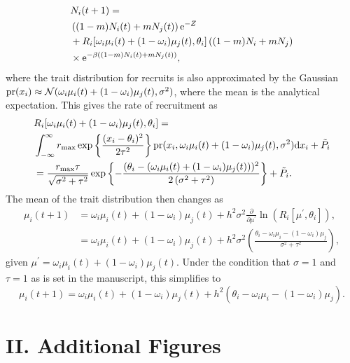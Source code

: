 \documentclass{revtex4}
\begin{document}
\begin{align}
  &N_i(t+1) = \\ \nonumber
  &\left((1-m)N_i(t) + m N_j(t) \right){\rm e}^{-Z} \\ \nonumber
  &+ R_i[\omega_i\mu_i(t) + (1-\omega_i)\mu_j(t),\theta_i]\left((1-m)N_i + mN_j\right) \\ \nonumber
  &\times {\rm e}^{-\beta ((1-m)N_i(t) + m N_j(t))},
  \label{eq:N}
\end{align}
where the trait distribution for recruits is also approximated by the Gaussian 
${\rm pr}(x_i) \approx \mathcal{N}(\omega_i\mu_i(t) + (1-\omega_i)\mu_j(t),\sigma^2)$, where the mean is the analytical expectation.
This gives the rate of recruitment as 
\begin{align}
  &R_i[\omega_i\mu_i(t) + (1-\omega_i)\mu_j(t),\theta_i] = \\ \nonumber
  &\int_{-\infty}^\infty r_{\rm max}\exp\left\{\frac{(x_i-\theta_i)^2}{2\tau^2}\right\} {\rm pr}(x_i,\omega_i\mu_i(t) + (1-\omega_i)\mu_j(t),\sigma^2) {\rm d}x_i +\tilde{P}_i\\ \nonumber
  &= \frac{r_{\rm max} \tau  }{\sqrt{\sigma ^2+\tau ^2}}\exp\left\{-\frac{(\theta_i-(\omega_i\mu_i(t) + (1-\omega_i)\mu_j(t)))^2}{2 \left(\sigma ^2+\tau ^2\right)}\right\} +\tilde{P}_i.
\end{align}
The mean of the trait distribution then changes as
\begin{align}
  \label{eq:mu}
  \mu_i(t+1) &= \omega_i\mu_i(t) + (1-\omega_i)\mu_j(t) + h^2\sigma^2\frac{\partial}{\partial \mu^\prime}\ln\left(R_i[\mu^\prime,\theta_i] \right), \\ \nonumber
  &= \omega_i\mu_i(t) + (1-\omega_i)\mu_j(t) + h^2\sigma^2\left(\frac{\theta_i - \omega_i\mu_i - (1-\omega_i)\mu_j}{\sigma^2+\tau^2} \right),
\end{align}
given $\mu^\prime = \omega_i \mu_i(t)+ (1-\omega_i)\mu_j(t)$.
Under the condition that $\sigma=1$ and $\tau = 1$ as is set in the manuscript, this simplifies to
\begin{equation}
  \mu_i(t+1) = \omega_i\mu_i(t) + (1-\omega_i)\mu_j(t) + h^2\left(\theta_i - \omega_i\mu_i - (1-\omega_i)\mu_j\right).
\end{equation}






\clearpage


\section*{II. Additional Figures}
\end{document}
